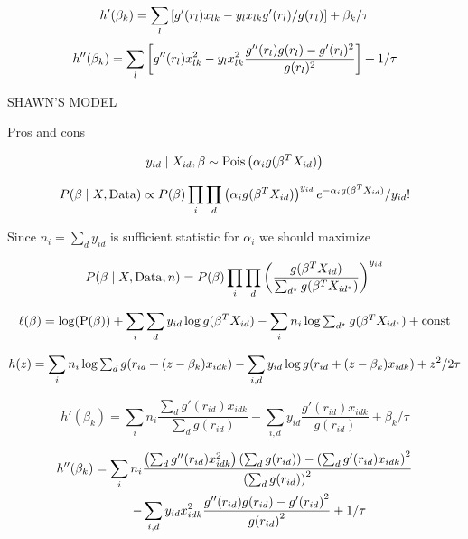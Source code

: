 \documentclass[12pt, letter]{article}
\begin{document}
$$h'(\beta_k) = \sum_l \zags{g'(r_l)x_{lk} - y_l x_{lk} g'(r_l)/g(r_l)} + \beta_k/\tau$$
$$h''(\beta_k) = \sum_l \zags{g''(r_l)x_{lk}^2 - y_l x_{lk}^2 \frac{g''(r_l)g(r_l) - g'(r_l)^2}{g(r_l)^2}} + 1/\tau$$


\newpage
{\LARGE SHAWN'S MODEL}

Pros and cons


$$y_{id}\mid X_{id}, \beta \sim \mathrm{Pois}\zag{\alpha_i g(\beta^T X_{id})}$$

$$P(\beta\mid X, \mathrm{Data}) \propto P(\beta) \prod_i \prod_d
    \zag{\alpha_i g(\beta^T X_{id})}^{y_{id}} e^{-\alpha_i g(\beta^T X_{id})}/y_{id}!$$

Since $n_i = \sum_d y_{id}$ is sufficient statistic for $\alpha_i$ we should maximize

$$P(\beta\mid X, \mathrm{Data}, n) = P(\beta) \prod_i \prod_d
    \zag{\frac{g(\beta^T X_{id})}{\sum_{d^\star}g(\beta^T X_{id^\star})}}^{y_{id}}$$


$$\ell(\beta) = \log(\mathrm{P(\beta)}) + \sum_i \sum_d y_{id}\log{g(\beta^T X_{id})} -
    \sum_i n_i \log {\TS\sum_{d^\star}{g(\beta^T X_{id^\star})}} + \mathrm{const}$$

$$h(z) = \sum_i n_i \log {\TS\sum_{d}{g(r_{id} + (z-\beta_k) x_{idk})}} -
    \sum_{i,d} y_{id}\log{g(r_{id} + (z-\beta_k) x_{idk})} + z^2/2\tau$$

$$h'(\beta_k) = \sum_i n_i \frac{\sum_{d}g'(r_{id})x_{idk}}{\sum_{d} g(r_{id})} -
    \sum_{i,d} y_{id}\frac{g'(r_{id})x_{idk}}{ g(r_{id})} + \beta_k/\tau$$

\begin{equation*}
\begin{split}
h''(\beta_k) = \sum_i n_i& \frac{\zag{\sum_{d}g''(r_{id})x_{idk}^2}\zag{\sum_{d}g(r_{id})} - \zag{\sum_{d}g'(r_{id})x_{idk}}^2 }{\zag{\sum_{d} g(r_{id})}^2} \\ -&
\sum_{i,d} y_{id}x_{idk}^2\frac{g''(r_{id})g(r_{id})- {g'(r_{id})}^2}{{g(r_{id})}^2} + 1/\tau
\end{split}
\end{equation*}


\end{document}
